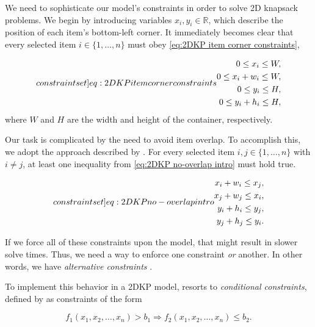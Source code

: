 We need to sophisticate our model's constraints in order to solve 2D knapsack problems. We begin by introducing variables $x_i, y_i \in \mathbb{R}$, which describe the position of each item's bottom-left corner. It immediately becomes clear that every selected item $i \in \{1,\dots,n\}$ must obey \cref{eq:2DKP item corner constraints},

\begin{align}
    \label[constraint set]{eq:2DKP item corner constraints}
    \begin{split}
        0 \leq x_i \leq W,\\
        0 \leq x_i + w_i \leq W,\\
        0 \leq y_i \leq H,\\
        0 \leq y_i + h_i \leq H,
    \end{split}
\end{align}
where $W$ and $H$ are the width and height of the container, respectively.

Our task is complicated by the need to avoid item overlap. To accomplish this, we adopt the approach described by \textcite{KALVELAGEN2021}. For every selected item $i, j \in \{1,\dots,n\}$ with $i \neq j$, at least one inequality from \cref{eq:2DKP no-overlap intro} must hold true.

\begin{subequations}
    \label[constraint set]{eq:2DKP no-overlap intro}
    \begin{align}
        x_i + w_i \leq x_j,\\
        x_j + w_j \leq x_i,\\
        y_i + h_i \leq y_j,\\
        y_j + h_j \leq y_i.
    \end{align}
\end{subequations}

If we force all of these constraints upon the model, that might result in slower solve times. Thus, we need a way to enforce one constraint \emph{or} another. In other words, we have \emph{alternative constraints} \cite{BRADLEY1977}.

To implement this behavior in a 2DKP model, \textcite{KALVELAGEN2021} resorts to \emph{conditional constraints}, defined by \textcite{BRADLEY1977} as constraints of the form

\begin{equation}
    f_1(x_1,x_2,\dots,x_n) > b_1 \Rightarrow f_2(x_1,x_2,\dots,x_n) \leq b_2.
\end{equation}

